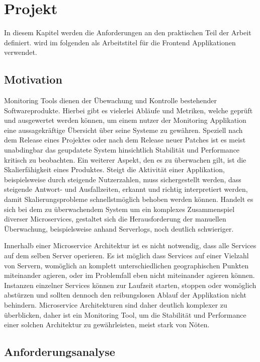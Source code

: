 
\chapter{Projekt \projectname}

In diesem Kapitel werden die Anforderungen an den praktischen Teil der Arbeit definiert.
\projectname wird im folgenden als Arbeitstitel für die Frontend Applikationen verwendet.

\section{Motivation}

Monitoring Tools dienen der Übewachung und Kontrolle bestehender Softwareprodukte.
Hierbei gibt es vielerlei Abläufe und Metriken, welche geprüft und ausgewertet werden können, um einem nutzer der Monitoring Applikation
eine aussagekräftige Übersicht über seine Systeme zu gewähren. Speziell nach dem Release eines Projektes oder nach dem Release neuer Patches
ist es meist unabdingbar das geupdatete System hinsichtlich Stabilität und Performance kritisch zu beobachten. Ein weiterer Aspekt, den es zu überwachen gilt,
ist die Skalierfähigkeit eines Produktes. Steigt die Aktivität einer Applikation, beispielsweise durch steigende Nutzerzahlen,
muss sichergestellt werden, dass steigende Antwort- und Ausfallzeiten, erkannt und richtig interpretiert werden, damit Skalierungsprobleme schnellstmöglich behoben werden können.
Handelt es sich bei dem zu überwachendem System um ein komplexes Zusammenspiel diverser Microservices, gestaltet sich die Herausforderung der manuellen Überwachung, beispielsweise anhand
Serverlogs, noch deutlich schwieriger.

Innerhalb einer Microservice Architektur ist es nicht notwendig, dass alle Services auf dem selben Server operieren.
Es ist möglich dass Services auf einer Vielzahl von Servern, womöglich an komplett unterschiedlichen geographischen Punkten miteinander agieren,
oder im Problemfall eben nicht miteinander agieren können. Instanzen einzelner Services können zur Laufzeit starten, stoppen oder womöglich abstürzen
und sollten dennoch den reibungslosen Ablauf der Applikation nicht behindern. Microservice Architekturen sind daher deutlich komplexer zu überblicken,
daher ist ein Monitoring Tool, um die Stabilität und Performance einer solchen Architektur zu gewährleisten, meist stark von Nöten.


\section{Anforderungsanalyse}

